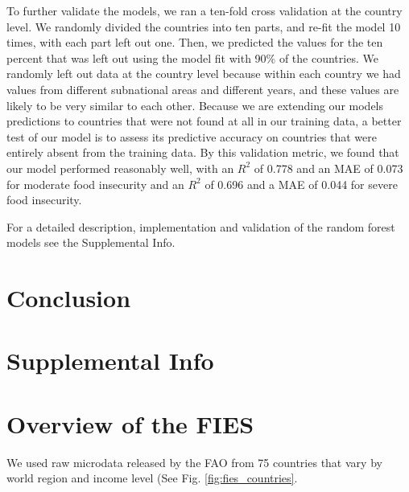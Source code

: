 \documentclass{article}
\begin{document}
To further validate the models, we ran a ten-fold cross validation at the country level.  We randomly divided the countries into ten parts, and re-fit the model 10 times, with each part left out one.  Then, we predicted the values for the ten percent that was left out using the model fit with 90\% of the countries.  We randomly left out data at the country level because within each country we had values from different subnational areas and different years, and these values are likely to be very similar to each other.  Because we are extending our models predictions to countries that were not found at all in our training data, a better test of our model is to assess its predictive accuracy on countries that were entirely absent from the training data.  By this validation metric, we found that our model performed reasonably well, with an $R^2$ of 0.778 and an MAE of 0.073 for moderate food insecurity and an $R^2$ of 0.696 and a MAE of 0.044 for severe food insecurity.

For a detailed description, implementation and validation of the random forest models see the Supplemental Info.

\section{Conclusion}

\printbibliography

\section*{Supplemental Info}
\setcounter{table}{0}
\setcounter{figure}{0}
\setcounter{section}{0}
\renewcommand{\thetable}{S\arabic{table}}
\renewcommand{\thefigure}{S\arabic{figure}}
\renewcommand{\thesection}{S\arabic{section}}

\section{Overview of the FIES}
We used raw microdata released by the FAO from 75 countries that vary by world region and income level (See Fig. \ref{fig:fies_countries}.
\end{document}
